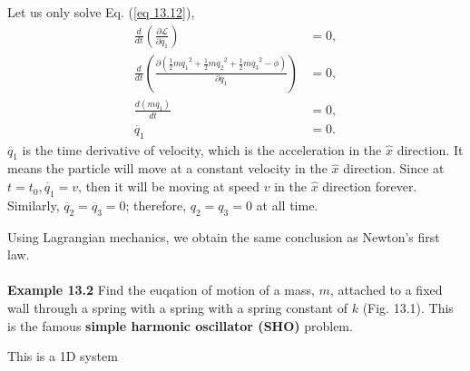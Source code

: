 \documentclass{article}
\begin{document}
Let us only solve Eq. (\ref{eq 13.12}),
\begin{align*}\label{eq 13.15}
    \frac{d}{dt}\left(\frac{\partial \mathcal{L}}{\partial \dot{q_1}}\right)&=0,\\
    \frac{d}{dt}\left(\frac{\partial(\frac{1}{2}m\dot{q_1}^2+\frac{1}{2}m\dot{q_2}^2+
    \frac{1}{2}m\dot{q_3}^2-\phi)}{\partial \dot{q_1}}\right)&=0,\\
    \frac{d(m\dot{q_1})}{dt}&=0,\\
    \ddot{q_1}&=0.\tag{13.15}
\end{align*}
$\ddot{q_1}$ is the time derivative of velocity, which is the acceleration in the $\hat{x}$ direction.
It means the particle will move at a constant velocity in the $\hat{x}$ direction. Since at 
$t=t_0,\dot{q_1}=v$, then it will be moving at speed $v$ in the $\hat{x}$ direction forever. Similarly,
$\ddot{q_2}=\ddot{q_3}=0$; therefore, $q_2=q_3=0$ at all time.

Using Lagrangian mechanics, we obtain the same conclusion as Newton's first law.
\\\\
\textbf{Example 13.2} Find the euqation of motion of a mass, $m$, attached to a fixed wall through a spring with a spring 
with a spring constant of $k$ (Fig. 13.1). This is the famous \textbf{simple harmonic oscillator (SHO)}
problem.

This is a 1D system
\printbibliography
\end{document}
